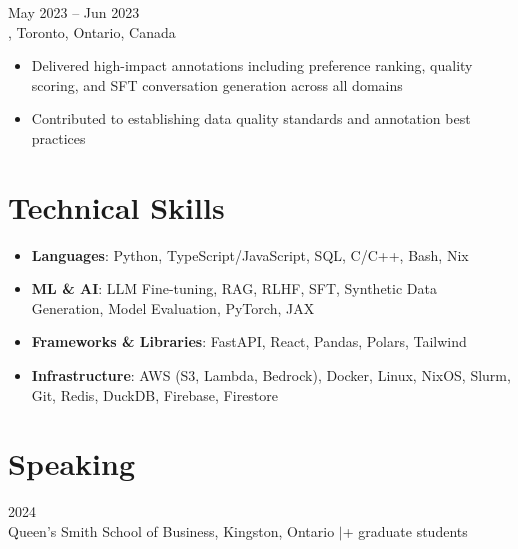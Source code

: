 \documentclass[letterpaper,10pt]{article}
\begin{document}
\hspace{0.15in}{\large\bfseries Data Quality Specialist} \hfill {\small May 2023 -- Jun 2023} \\
\hspace{0.15in}{\bfseries Cohere}, Toronto, Ontario, Canada
\vspace{-2pt}
\begin{itemize}[leftmargin=0.35in, itemsep=-2pt, topsep=0pt, labelsep=0.035in]
\item Delivered high-impact annotations including preference ranking, quality scoring, and SFT conversation generation across all domains
\item Contributed to establishing data quality standards and annotation best practices
\end{itemize}
\vspace{-2pt}



\section{Technical Skills}

\vspace{-4pt}
\begin{itemize}[leftmargin=0.35in, itemsep=-1pt, topsep=0pt, labelsep=0.035in]
\item \textbf{Languages}: Python, TypeScript/JavaScript, SQL, C/C++, Bash, Nix
\item \textbf{ML \& AI}: LLM Fine-tuning, RAG, RLHF, SFT, Synthetic Data Generation, Model Evaluation, PyTorch, JAX
\item \textbf{Frameworks \& Libraries}: FastAPI, React, Pandas, Polars, Tailwind
\item \textbf{Infrastructure}: AWS (S3, Lambda, Bedrock), Docker, Linux, NixOS, Slurm, Git, Redis, DuckDB, Firebase, Firestore
\end{itemize}

\section{Speaking}

\hspace{0.15in}{\bfseries Guest Lecturer on AI and Synthetic Data Generation for MMA Program} \hfill {\small 2024} \\
\hspace{0.15in}Queen's Smith School of Business, Kingston, Ontario \enspace$|$+ graduate students
\end{document}
